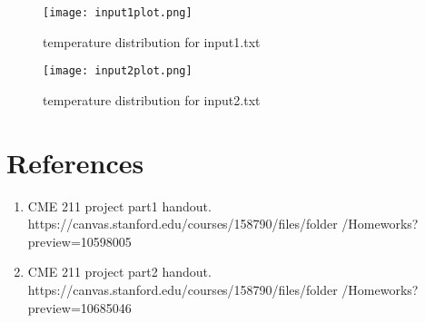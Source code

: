 \documentclass{article}
\begin{document}
\begin{figure}[]
\centering
\texttt{[image: input1plot.png]}
\caption{\label{fig:frog}temperature distribution for input1.txt}
\end{figure}

\begin{figure}[]
\centering
\texttt{[image: input2plot.png]}
\caption{\label{fig:frog}temperature distribution for input2.txt}
\end{figure}

\section{References}


\begin{enumerate}
\item CME 211 project part1 handout.
https://canvas.stanford.edu/courses/158790/files/folder
/Homeworks?preview=10598005

\item CME 211 project part2 handout. https://canvas.stanford.edu/courses/158790/files/folder
/Homeworks?preview=10685046

\end{enumerate}
\end{document}

